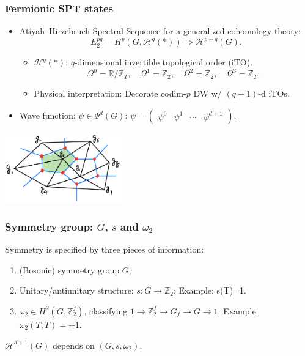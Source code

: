 \documentclass[xcolor=table, aspectratio=169]{beamer}
\newcommand{\uone}{\mathbb R/\mathbb Z}
\begin{document}
\begin{frame}
  \frametitle{Fermionic SPT states}
  \begin{itemize}
  \item Atiyah–Hirzebruch Spectral Sequence for a generalized cohomology theory:
    \[E_2^{pq} = H^p(G, \mathcal H^q(*)) \Rightarrow \mathcal H^{p+q}(G).\]
    \begin{itemize}
    \item $\mathcal H^q(*)$: $q$-dimensional invertible topological order (iTO).
    \[\Omega^0=\uone_T,\quad\Omega^1=\mathbb Z_2,\quad\Omega^2=\mathbb Z_2,\quad\Omega^3=\mathbb Z_T.\]
    \item Physical interpretation: Decorate codim-$p$ DW w/ $(q+1)$-d iTOs.
    \end{itemize}
  \item Wave function: $\psi\in \Psi^d(G)$: $\psi=\begin{pmatrix}\psi^0&\psi^1&\cdots&\psi^{d+1}\end{pmatrix}$.
  \end{itemize}
  \begin{center}
    \includegraphics[height=3cm]{decoration}
  \end{center}
\end{frame}

\begin{frame}
  \frametitle{Symmetry group: $G$, $s$ and $\omega_2$}
  Symmetry is specified by three pieces of information:
    \begin{enumerate}
    \item (Bosonic) symmetry group $G$;
    \item Unitary/antiunitary structure: $s:G\rightarrow \mathbb Z_2$; Example: s(T)=1.
    \item $\omega_2\in H^2(G, \mathbb Z_2^f)$, classifying $1\rightarrow\mathbb Z_2^f\rightarrow G_f\rightarrow G\rightarrow1$. Example: $\omega_2(T, T)=\pm1$.
    \end{enumerate}
	$\mathcal H^{d+1}(G)$ depends on $(G, s, \omega_2)$.
\end{frame}
\end{document}
